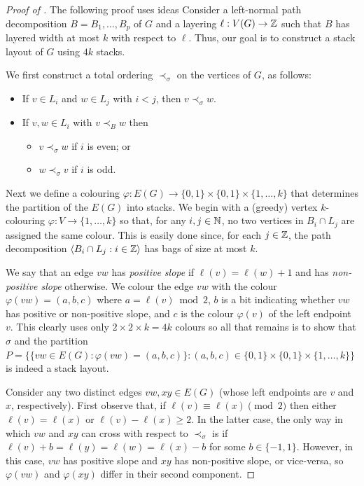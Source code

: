 \documentclass{patmorin}
\begin{document}
\begin{proof}[Proof of ]
  The following proof uses ideas
  Consider a left-normal path decomposition $B=B_1,\ldots,B_p$ of $G$ and a layering $\ell:V(G)\to\mathbb{Z}$ such that $B$ has layered width at most $k$ with respect to $\ell$.  Thus, our goal is to construct a stack layout of $G$ using $4k$ stacks.
  
  We first construct a total ordering $\prec_\sigma$ on the vertices of $G$, as follows:
  \begin{itemize}
    \item If $v\in L_i$ and $w\in L_j$ with $i < j$, then $v\prec_\sigma w$.
    \item If $v,w\in L_i$ with $v \prec_B w$ then
    \begin{itemize}
      \item $v\prec_\sigma w$ if $i$ is even; or
      \item $w\prec_\sigma v$ if $i$ is odd.
    \end{itemize}
  \end{itemize}

  Next we define a colouring $\varphi:E(G)\to\{0,1\}\times\{0,1\}\times\{1,\ldots,k\}$ that determines the partition of the $E(G)$ into stacks.  We begin with a (greedy) vertex $k$-colouring $\varphi:V\to \lbrace 1,\ldots,k\rbrace$ so that, for any $i,j\in\mathbb{N}$, no two vertices in $B_i\cap L_j$ are assigned the same colour. This is easily done since, for each $j\in\mathbb{Z}$, the path decomposition $\langle B_i\cap L_j : i\in \mathbb{Z}\rangle$ has bags of size at most $k$.  

  We say that an edge $vw$ has \emph{positive slope} if $\ell(v)=\ell(w)+1$ and has \emph{non-positive slope} otherwise.  We colour the edge $vw$ with the colour $\varphi(vw)=(a,b,c)$ where $a=\ell(v)\bmod 2$, $b$ is a bit indicating whether $vw$ has positive or non-positive slope, and $c$ is the colour $\varphi(v)$ of the left endpoint $v$.  This clearly uses only $2\times2\times k=4k$ colours so all that remains is to show that
  $\sigma$ and the partition $P=\{\{vw\in E(G):\varphi(vw)=(a,b,c)\}:(a,b,c)\in \{0,1\}\times\{0,1\}\times\{1,\ldots,k\}\}$  is indeed a stack layout.  

  Consider any two distinct edges $vw,xy\in E(G)$ (whose left endpoints are $v$ and $x$, respectively).  First observe that, if $\ell(v)\equiv \ell(x)\pmod 2$ then either $\ell(v)=\ell(x)$ or $\ell(v)-\ell(x)\ge 2$. In the latter case, the only way in which $vw$ and $xy$ can cross with respect to $\prec_\sigma$ is if $\ell(v)+b = \ell(y)=\ell(w) = \ell(x)-b$ for some $b\in\{-1,1\}$. However, in this case, $vw$ has positive slope and $xy$ has non-positive slope, or vice-versa, so $\varphi(vw)$ and $\varphi(xy)$ differ in their second component.  
  

\end{proof}
\end{document}
